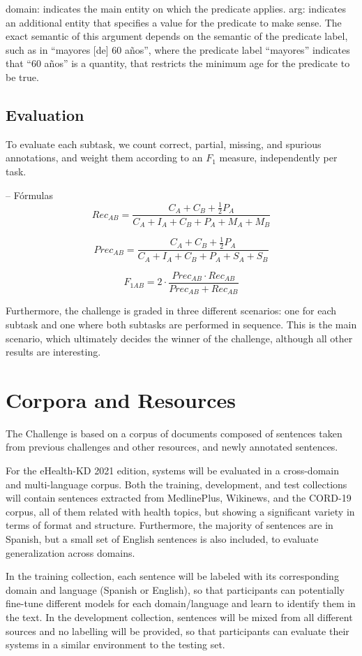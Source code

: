 \documentclass[a4paper,11pt,twocolumn,twoside]{article}
\begin{document}
domain: indicates the main entity on which the predicate applies.
arg: indicates an additional entity that specifies a value for the predicate to make sense. The exact semantic of this argument depends on the semantic of the predicate label, such as in “mayores [de] 60 años”, where the predicate label “mayores” indicates that “60 años” is a quantity, that restricts the minimum age for the predicate to be true.

\subsection{Evaluation}

To evaluate each subtask, we count correct, partial, missing, and spurious
annotations, and weight them according to an $F_1$ measure, independently per task.

-- Fórmulas
$$Rec_{AB} = \frac{C_A + C_B + \frac{1}{2} P_A}{C_A + I_A + C_B + P_A + M_A + M_B}$$

$$Prec_{AB} = \frac{C_A + C_B + \frac{1}{2} P_A}{C_A + I_A + C_B + P_A + S_A + S_B}$$

$$F_{1AB} = 2 \cdot \frac{Prec_{AB} \cdot Rec_{AB}}{Prec_{AB} + Rec_{AB}}$$

Furthermore, the challenge is graded in three different scenarios:
one for each subtask and one where both subtasks are performed in sequence.
This is the main scenario, which ultimately decides the winner of the challenge,
although all other results are interesting.

\section{Corpora and Resources}\label{sec:resources}

The Challenge is based on a corpus of documents composed of
sentences taken from previous challenges and other resources,
and newly annotated sentences.

For the eHealth-KD 2021 edition, systems will be evaluated in a cross-domain and multi-language corpus. 
Both the training, development, and test collections will contain sentences extracted from MedlinePlus, Wikinews, and the CORD-19 corpus, 
all of them related with health topics, but showing a significant variety in terms of format and structure. 
Furthermore, the majority of sentences are in Spanish, but a small set of English sentences is also included, to evaluate generalization across domains.

In the training collection, each sentence will be labeled with its corresponding domain and language (Spanish or English), 
so that participants can potentially fine-tune different models for each domain/language and learn to identify them in the text. 
In the development collection, sentences will be mixed from all different sources and no labelling will be provided, 
so that participants can evaluate their systems in a similar environment to the testing set.
\end{document}

